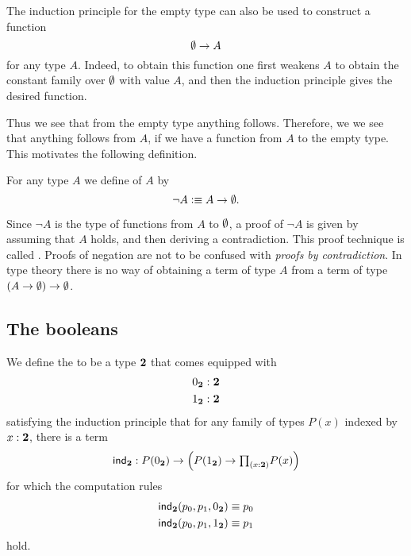The induction principle for the empty type can also be used to construct a function
\begin{equation*}
  \emptyset\to A
\end{equation*}
for any type $A$. Indeed, to obtain this function one first weakens $A$ to obtain the constant family over $\emptyset$ with value $A$, and then the induction principle gives the desired function.

Thus we see that from the empty type anything follows. Therefore, we we see that anything follows from $A$, if we have a function from $A$ to the empty type. This motivates the following definition.

\begin{defn}
  For any type $A$ we define  of $A$ by
  \begin{equation*}
    \neg A\vcentcolon\equiv A\to\emptyset.
  \end{equation*}
\end{defn}

Since $\neg A$ is the type of functions from $A$ to $\emptyset$, a proof of $\neg A$ is given by assuming that $A$ holds, and then deriving a contradiction. This proof technique is called . Proofs of negation are not to be confused with \emph{proofs by contradiction}. In type theory there is no way of obtaining a term of type $A$ from a term of type $(A\to \emptyset)\to\emptyset$.

\subsection{The booleans}
\begin{defn}
We define the  to be a type $\mathbf{2}$ that comes equipped with
\begin{align*}
{0_{\ensuremath{\mathbf{2}}}} & : \mathbf{2} \\
{1_{\mathbf{2}}} & : \mathbf{2}
\end{align*}
satisfying the induction principle that for any family of types $P(x)$ indexed by $x:\mathbf{2}$, there is a term
\begin{equation*}
\indbool : P(\bfalse)\to \Big(P(\btrue)\to \prd{x:\bool}P(x)\Big)
\end{equation*}
for which the computation rules
\begin{align*}
\mathsf{ind}_{\mathbf{2}}(p_0,p_1,{0_{\mathbf{2}}}) & \equiv p_0 \\
\mathsf{ind}_{\mathbf{2}}(p_0,p_1,{1_{\mathbf{2}}}) & \equiv p_1
\end{align*}
hold.
\end{defn}

